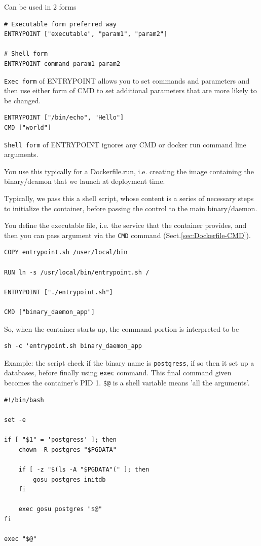 Can be used in 2 forms
\begin{verbatim}
# Executable form preferred way  
ENTRYPOINT ["executable", "param1", "param2"] 

# Shell form  
ENTRYPOINT command param1 param2
\end{verbatim}

\verb!Exec form! of ENTRYPOINT allows you to set commands and
parameters and then use either form of CMD to set additional parameters that are
more likely to be changed.
\begin{verbatim}
ENTRYPOINT ["/bin/echo", "Hello"]  
CMD ["world"]  
\end{verbatim}

\verb!Shell form! of ENTRYPOINT ignores any CMD or docker run command line arguments.

You use this typically for a Dockerfile.run, i.e. creating the image containing
the binary/deamon that we launch at deployment time.

Typically, we pass this a shell script, whose content is a series of necessary
steps to initialize the container, before passing the control to the main
binary/daemon.

You define the executable file, i.e. the service that the container provides, 
and then you can pass argument via the \verb!CMD! command (Sect.\ref{sec:Dockerfile-CMD}).

\begin{verbatim}
COPY entrypoint.sh /user/local/bin

RUN ln -s /usr/local/bin/entrypoint.sh /

ENTRYPOINT ["./entrypoint.sh"]

CMD ["binary_daemon_app"]
\end{verbatim}


So, when the container starts up, the command portion is interpreted to be
\begin{verbatim}
sh -c 'entrypoint.sh binary_daemon_app
\end{verbatim}

Example: the script check if the binary name is \verb!postgress!, if so then it
set up a databases, before finally using \verb!exec! command. This final command
given becomes the container's PID 1. \verb!$@! is a shell variable means 'all
the arguments'.
\begin{verbatim}
#!/bin/bash

set -e 

if [ "$1" = 'postgress' ]; then
    chown -R postgres "$PGDATA"
    
    if [ -z "$(ls -A "$PGDATA"(" ]; then
        gosu postgres initdb
    fi
    
    exec gosu postgres "$@"
fi

exec "$@"
\end{verbatim}

